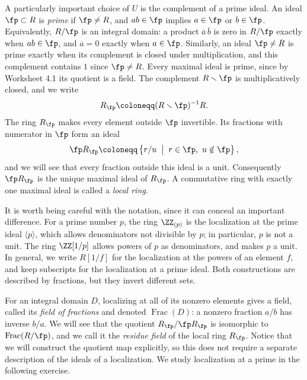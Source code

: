 \documentclass[12pt,reqno]{amsart}
\DeclareMathOperator{\Frac}{Frac}
\begin{document}
\hrulefill

A particularly important choice of $U$ is the complement of a prime ideal. An ideal $\fp\subset R$ is \emph{prime} if $\fp\neq R$, and $ab\in\fp$ implies $a\in\fp$ or $b\in\fp$. Equivalently, $R/\fp$ is an integral domain: a product $\overline a\,\overline b$ is zero in $R/\fp$ exactly when $ab\in\fp$, and $\overline a=0$ exactly when $a\in\fp$. Similarly, an ideal $\fp\neq R$ is prime exactly when its complement is closed under multiplication, and this complement contains $1$ since $\fp\neq R$. Every maximal ideal is prime, since by Worksheet 4.1 its quotient is a field. The complement $R\smallsetminus\fp$ is multiplicatively closed, and we write
\[
R_{\fp}\coloneqq(R\smallsetminus\fp)^{-1}R.
\]
The ring $R_{\fp}$ makes every element outside $\fp$ invertible. Its fractions with numerator in $\fp$ form an ideal
\[
\fp R_{\fp}\coloneqq\left\{r/u \;\; \big| \;\; r\in\fp,\ u\notin\fp\right\},
\]
and we will see that every fraction outside this ideal is a unit. Consequently $\fp R_{\fp}$ is the unique maximal ideal of $R_{\fp}$. A commutative ring with exactly one maximal ideal is called a \emph{local ring}.

It is worth being careful with the notation, since it can conceal an important difference. For a prime number $p$, the ring $\ZZ_{(p)}$ is the localization at the prime ideal $\langle p\rangle$, which allows denominators not divisible by $p$; in particular, $p$ is not a unit. The ring $\ZZ[1/p]$ allows powers of $p$ as denominators, and makes $p$ a unit. In general, we write $R[1/f]$ for the localization at the powers of an element $f$, and keep subscripts for the localization at a prime ideal. Both constructions are described by fractions, but they invert different sets.

For an integral domain $D$, localizing at all of its nonzero elements gives a field, called its \emph{field of fractions} and denoted $\Frac(D)$: a nonzero fraction $a/b$ has inverse $b/a$. We will see that the quotient $R_{\fp}/\fp R_{\fp}$ is isomorphic to $\Frac(R/\fp)$, and we call it the \emph{residue field} of the local ring $R_{\fp}$. Notice that we will construct the quotient map explicitly, so this does not require a separate description of the ideals of a localization. We study localization at a prime in the following exercise.

\hrulefill
\end{document}
